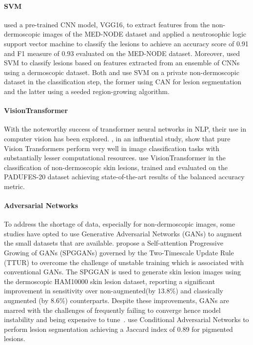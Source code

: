 \documentclass[12pt, a4paper]{article}
\begin{document}
\paragraph{SVM}
\cite{9564195} used a pre-trained CNN model, VGG16, to extract features from the non-dermoscopic images of the MED-NODE dataset and applied a neutrosophic logic support vector machine to classify the lesions to achieve an accuracy score of 0.91 and F1 measure of 0.93 evaluated on the MED-NODE dataset. Moreover, \cite{codella2017deep} used SVM to classify lesions based on features extracted from an ensemble of CNNs using a dermoscopic dataset. Both \cite{udrea2020accuracy} and \cite{jaworek2018eskin} use SVM on a private non-dermoscopic dataset in the classification step, the former using CAN for lesion segmentation and the latter using a seeded region-growing algorithm.
\paragraph{VisionTransformer}
With the noteworthy success of transformer neural networks in NLP, their use in computer vision has been explored. \cite{dosovitskiy2020image}, in an influential study, show that pure Vision Transformers perform very well in image classification tasks with substantially lesser computational resources. \cite{de2022exploring} use VisionTransformer in the classification of non-dermoscopic skin lesions, trained and evaluated on the PADUFES-20 dataset achieving state-of-the-art results of the balanced accuracy metric.
\paragraph{Adversarial Networks}
To address the shortage of data, especially for non-dermoscopic images, some studies have opted to use Generative Adversarial Networks (GANs) to augment the small datasets that are available. \cite{abdelhalim2021data} propose a Self-attention Progressive Growing of GANs (SPGGANs) governed by the Two-Timescale Update Rule (TTUR) to overcome the challenge of unstable training which is associated with conventional GANs. The SPGGAN is used to generate skin lesion images using the dermoscopic HAM10000 skin lesion dataset, reporting a significant improvement in sensitivity over non-augmented(by 13.8\%) and classically augmented (by 8.6\%) counterparts. Despite these improvements, GANs are marred with the challenges of frequently failing to converge hence model instability and being expensive to tune~\citep{perez2021convolutional}. \cite{udrea2020accuracy} use Conditional Adversarial Networks to perform lesion segmentation achieving a Jaccard index of 0.89 for pigmented lesions.
\end{document}
